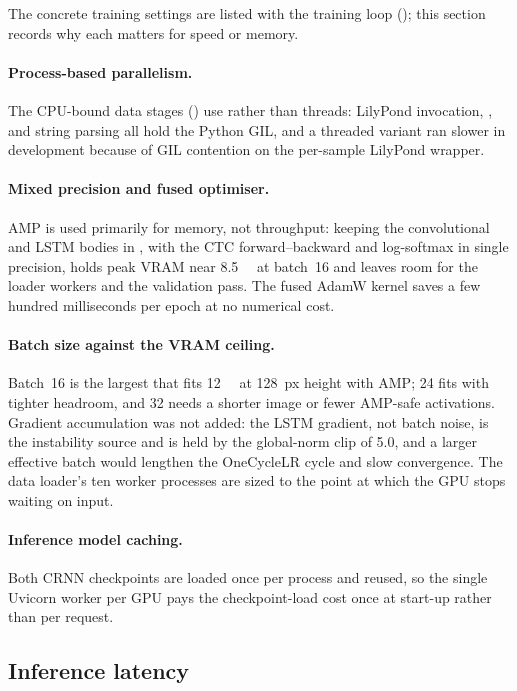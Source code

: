 The concrete training settings are listed with the training loop
(); this section records why each matters for
speed or memory.

\paragraph{Process-based parallelism.}
The CPU-bound data stages () use
 rather than threads: LilyPond invocation,
, and string parsing all hold the Python GIL, and
a threaded variant ran slower in development because of GIL
contention on the per-sample LilyPond wrapper.

\paragraph{Mixed precision and fused optimiser.}
AMP is used primarily for memory, not throughput: keeping the
convolutional and LSTM bodies in , with the CTC
forward--backward and log-softmax in single precision, holds peak VRAM
near \SI{8.5}{\giga\byte} at batch~\num{16} and leaves room for the
loader workers and the validation pass. The fused AdamW kernel saves a
few hundred milliseconds per epoch at no numerical cost.

\paragraph{Batch size against the VRAM ceiling.}
Batch~\num{16} is the largest that fits \SI{12}{\giga\byte} at
\SI{128}{px} height with AMP; \num{24} fits with tighter headroom, and
\num{32} needs a shorter image or fewer AMP-safe activations. Gradient
accumulation was not added: the LSTM gradient, not batch noise, is the
instability source and is held by the global-norm clip of \num{5.0},
and a larger effective batch would lengthen the OneCycleLR cycle and
slow convergence. The data loader's ten worker processes are sized to
the point at which the GPU stops waiting on input.

\paragraph{Inference model caching.}
Both CRNN checkpoints are loaded once per process and reused, so the
single Uvicorn worker per GPU pays the checkpoint-load cost once at
start-up rather than per request.

\subsection{Inference latency}

